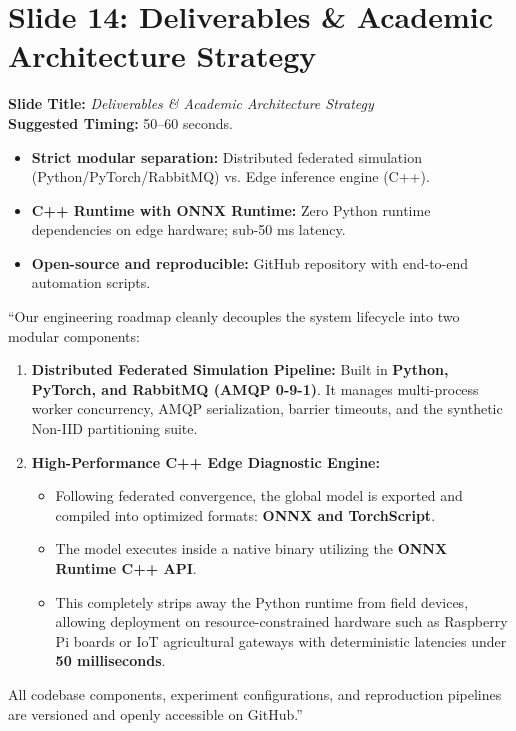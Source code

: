 \documentclass[11pt,a4paper]{article}
\begin{document}
\section{Slide 14: Deliverables \& Academic Architecture Strategy}
\textbf{Slide Title:} \textit{Deliverables \& Academic Architecture Strategy} \\
\textbf{Suggested Timing:} 50--60 seconds.

\begin{tcolorbox}[colframe=primaryblue, title=\textbf{Key Distributed Systems Points to Emphasize}]
\begin{itemize}[leftmargin=*]
    \item \textbf{Strict modular separation:} Distributed federated simulation (Python/PyTorch/RabbitMQ) vs. Edge inference engine (C++).
    \item \textbf{C++ Runtime with ONNX Runtime:} Zero Python runtime dependencies on edge hardware; sub-50 ms latency.
    \item \textbf{Open-source and reproducible:} GitHub repository with end-to-end automation scripts.
\end{itemize}
\end{tcolorbox}

\begin{tcolorbox}[colframe=darkgreen, title=\textbf{What to Say in the Presentation (Literal Script)}]
``Our engineering roadmap cleanly decouples the system lifecycle into two modular components:

\begin{enumerate}
    \item \textbf{Distributed Federated Simulation Pipeline:} Built in \textbf{Python, PyTorch, and RabbitMQ (AMQP 0-9-1)}. It manages multi-process worker concurrency, AMQP serialization, barrier timeouts, and the synthetic Non-IID partitioning suite.
    \item \textbf{High-Performance C++ Edge Diagnostic Engine:}
    \begin{itemize}
        \item Following federated convergence, the global model is exported and compiled into optimized formats: \textbf{ONNX and TorchScript}.
        \item The model executes inside a native binary utilizing the \textbf{ONNX Runtime C++ API}.
        \item This completely strips away the Python runtime from field devices, allowing deployment on resource-constrained hardware such as Raspberry Pi boards or IoT agricultural gateways with deterministic latencies under \textbf{50 milliseconds}.
    \end{itemize}
\end{enumerate}

All codebase components, experiment configurations, and reproduction pipelines are versioned and openly accessible on GitHub.''
\end{tcolorbox}
\end{document}
